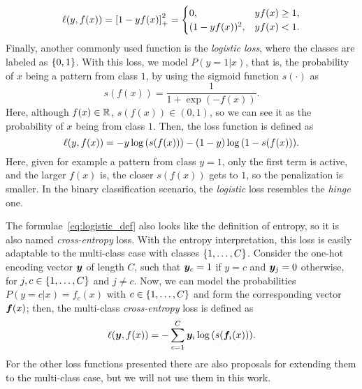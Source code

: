 \begin{equation}
    \label{eq:sqhinge_def}
    \lossf(y, f(x)) = \pospart{1 - yf(x)}^2 = 
    \begin{cases}
        0, & y f(x) \geq 1 ,\\
        (1 - y f(x))^2, & y f(x) < 1 .
    \end{cases}
\end{equation}
%
Finally, another commonly used function is the \emph{logistic loss}, where the classes are labeled as $\left\{0, 1\right\}$. With this loss, we model $P(y=1 \vert x)$, that is, the probability of $x$ being a pattern from class $1$, by using the sigmoid function $s(\cdot)$ as 
$$ s(f(x)) = \frac{1}{1 + \exp{(-f(x))}} .$$
Here, although $f(x) \in \mathbb{R}$, $s(f(x)) \in (0, 1)$, so we can see it as the probability of $x$ being from class $1$. Then, the loss function is defined as 
\begin{equation}
    \label{eq:logistic_def}
    \lossf(y, f(x)) = - y \log{(s(f(x)))} - (1 - y) \log{(1 - s(f(x)))} .
\end{equation} 
Here, given for example a pattern from class $y=1$, only the first term is active, and the larger $f(x)$ is, the closer $s(f(x))$ gets to $1$, so the penalization is smaller.
In the binary classification scenario, the \emph{logistic} loss resembles the \emph{hinge} one. 

The formulae~\eqref{eq:logistic_def} also looks like the definition of entropy, so it is also named \emph{cross-entropy} loss. 
With the entropy interpretation, this loss is easily adaptable to the multi-class case with classes $\left\{1, \ldots, C\right\}$. Consider the one-hot encoding vector $\bm{y}$ of length $C$, such that $\bm{y}_c = 1$ if $y=c$ and $\bm{y}_j = 0$ otherwise, for $j, c \in \left\{1, \ldots, C\right\}$ and $j \neq c$.
Now, we can model the probabilities $P(y=c \vert x) = f_c(x)$ with $c \in \left\{1, \ldots, C\right\}$ and form the corresponding vector $\bm{f}(x)$; then, the multi-class \emph{cross-entropy} loss is defined as 
\begin{equation}
    \label{eq:crossentropy_def}
    \lossf(\fv{y}, f(x)) = - \sum_{c=1}^C \fv{y}_i \log{(s(\fv{f}_i(x)))} .
\end{equation} 
For the other loss functions presented there are also proposals for extending them to the multi-class case, but we will not use them in this work.

